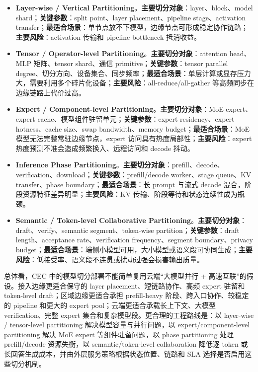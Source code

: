 \documentclass[a4paper,twocolumn,10pt]{ctexart}
\begin{document}
\begin{itemize}
\item \textbf{Layer-wise / Vertical Partitioning}。\textbf{主要切分对象}：layer、block、model shard；\textbf{关键参数}：split point、layer placement、pipeline stage、activation transfer；\textbf{最适合场景}：单节点放不下模型，边缘节点可形成稳定协作链路；\textbf{主要风险}：activation 传输和 pipeline bottleneck 抵消收益。
\item \textbf{Tensor / Operator-level Partitioning}。\textbf{主要切分对象}：attention head、MLP 矩阵、tensor shard、通信 primitive；\textbf{关键参数}：tensor parallel degree、切分方向、设备集合、同步频率；\textbf{最适合场景}：单层计算或显存压力大，需要利用多个碎片化设备；\textbf{主要风险}：all-reduce/all-gather 等高频同步在边缘链路上代价过高。
\item \textbf{Expert / Component-level Partitioning}。\textbf{主要切分对象}：MoE expert、expert cache、模型组件驻留单元；\textbf{关键参数}：expert residency、expert hotness、cache size、swap bandwidth、memory budget；\textbf{最适合场景}：MoE 模型无法完整常驻边缘节点，expert 访问具有热度局部性；\textbf{主要风险}：expert 热度预测不准会造成频繁换入、远程访问和 decode 抖动。
\item \textbf{Inference Phase Partitioning}。\textbf{主要切分对象}：prefill、decode、verification、download；\textbf{关键参数}：prefill/decode worker、stage queue、KV transfer、phase boundary；\textbf{最适合场景}：长 prompt 与流式 decode 混合，阶段资源特征差异明显；\textbf{主要风险}：KV 传输、阶段等待和状态连续性成为瓶颈。
\item \textbf{Semantic / Token-level Collaborative Partitioning}。\textbf{主要切分对象}：draft、verify、semantic segment、token-wise partition；\textbf{关键参数}：draft length、acceptance rate、verification frequency、segment boundary、privacy budget；\textbf{最适合场景}：端侧小模型可用，大小模型或语义段可协同生成；\textbf{主要风险}：低接受率、语义段不连贯或扰动过强会损害输出质量。
\end{itemize}





总体看，CEC 中的模型切分部署不能简单复用云端“大模型并行 + 高速互联”的假设。接入边缘更适合保守的 layer placement、短链路协作、高频 expert 驻留和 token-level draft；区域边缘更适合承担 prefill-heavy 阶段、跨入口协作、较稳定的 pipeline 和更大的 expert pool；云端更适合承载长上下文、大模型 verification、完整 expert 集合和复杂模型段。更合理的工程路线是：以 layer-wise / tensor-level partitioning 解决模型容量与并行问题，以 expert/component-level partitioning 解决 MoE expert 等组件驻留问题，以 phase partitioning 处理 prefill/decode 资源失衡，以 semantic/token-level collaboration 降低逐 token 或长回答生成成本，并由外层服务策略根据状态位置、链路和 SLA 选择是否启用这些切分机制。
\end{document}
